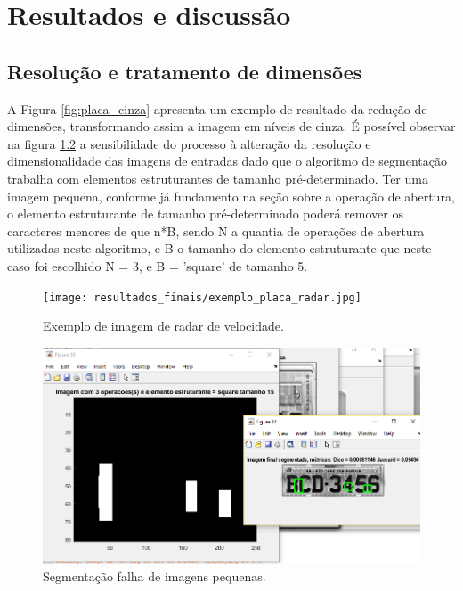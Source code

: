 \documentclass[
	12pt,				%
    oneside,			%
	a4paper,			%
	english,			%
	french,				%
	spanish,			%
	brazil,				%
	]{abntex2}
\begin{document}
\chapter{Resultados e discussão}

\section{Resolução e tratamento de dimensões}
A Figura \ref{fig:placa_cinza} apresenta um exemplo de resultado da redução de dimensões, transformando assim a imagem em níveis de cinza.
É possível observar na figura \ref{fig:resolucao_pequena} a sensibilidade do processo à alteração da resolução e dimensionalidade das imagens de entradas dado que o algoritmo de segmentação trabalha com elementos estruturantes de tamanho pré-determinado. Ter uma imagem pequena, conforme já fundamento na seção sobre a operação de abertura, o elemento estruturante de tamanho pré-determinado poderá remover os caracteres menores de que n*B, sendo N a quantia de operações de abertura utilizadas neste algoritmo, e B o tamanho do elemento estruturante que neste caso foi escolhido N = 3, e B = 'square' de tamanho 5.\\


\begin{figure}[!ht]
    \centering
    \texttt{[image: resultados\_finais/exemplo\_placa\_radar.jpg]}
    \caption{Exemplo de imagem de radar de velocidade.}
    \label{fig:placa_radar}
\end{figure}

\begin{figure}[!ht]
    \centering
    \includegraphics[scale=0.25]{dificuldades_experimentais/dimensionalidade.PNG}
    \caption{Segmentação falha de imagens pequenas.}
    \label{fig:resolucao_pequena}
\end{figure}
\end{document}
